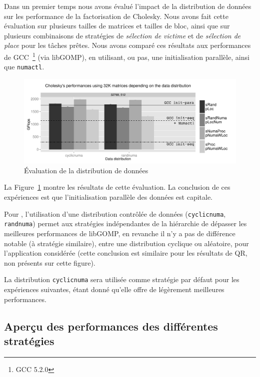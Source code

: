 \documentclass[parallelisme]{compas2016}
\begin{document}
Dans un premier temps nous avons évalué l'impact de la distribution de données sur
les performance de la factorisation de Cholesky. Nous avons fait cette évaluation sur plusieurs
tailles de matrices et tailles de bloc, ainsi que sur plusieurs combinaisons
de stratégies de \emph{sélection de victime} et de \emph{sélection de place} pour les tâches prêtes.
Nous avons comparé ces résultats aux performances de GCC~\footnote{GCC 5.2.0} (via libGOMP),
en utilisant, ou pas, une initialisation parallèle, ainsi que \verb/numactl/.

\begin{figure}[t]
  \centering
  \includegraphics[scale=0.5]{figures/graph_distrib.pdf}
\vspace*{-3ex}
  \caption{Évaluation de la distribution de données}
\label{fig:eval-distrib}
\vspace*{-5ex}
\end{figure}

La Figure~\ref{fig:eval-distrib} montre les résultats de cette évaluation.  
La conclusion de ces expériences est que l'initialisation parallèle des
données est capitale.

Pour \kaapi, l'utilisation d'une distribution contrôlée de données (\verb/cyclicnuma/,
\verb/randnuma/) permet aux stratégies indépendantes de la hiérarchie de dépasser
les meilleures performances de libGOMP, en revanche il n'y a pas de différence
notable (à stratégie similaire), entre une distribution cyclique ou aléatoire,
pour l'application considérée (cette conclusion est similaire pour les résultats
de QR, non présents sur cette figure).

La distribution \verb/cyclicnuma/ sera utilisée comme stratégie par défaut pour
les expériences suivantes, étant donné qu'elle offre de légèrement meilleures performances.

\subsection{Aperçu des performances des différentes stratégies}
\end{document}
